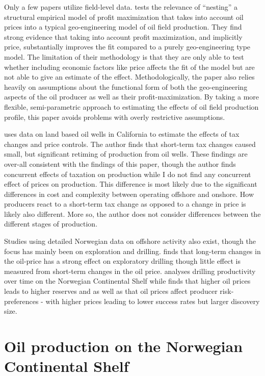 \documentclass[11pt]{article}
\begin{document}
Only a few papers utilize field-level data.  \citet{black_is_1998} tests the relevance of “nesting” a structural empirical model of profit maximization that takes into account oil prices into a typical geo-engineering model of oil field production.  They find strong evidence that taking into account profit maximization, and implicitly price, substantially improves the fit compared to a purely geo-engineering type model.   The limitation of their methodology is that they are only able to test whether including economic factors like price affects the fit of the model but are not able to give an estimate of the effect.  Methodologically, the paper also relies heavily on assumptions about the functional form of both the geo-engineering aspects of the oil producer as well as their profit-maximization.  By taking a more flexible, semi-parametric approach to estimating the effects of oil field production profile, this paper avoids problems with overly restrictive assumptions. 

\citet{rao_taxation_2010} uses data on land based oil wells in California to estimate the effects of tax changes and price controls.  The author finds that short-term tax changes caused small, but significant retiming of production from oil wells.  These findings are over-all consistent with the findings of this paper, though the author finds concurrent effects of taxation on production while I do not find any concurrent effect of prices on production.  This difference is most likely due to the significant differences in cost and complexity between operating offshore and onshore.  How producers react to a short-term tax change as opposed to a change in price is likely also different.  More so, the author does not consider differences between the different stages of production.   

Studies using detailed Norwegian data on offshore activity also exist, though the focus has mainly been on exploration and drilling.  \citet{mohn_exploration_2008} finds that long-term changes in the oil-price has a strong effect on exploratory drilling though little effect is measured from short-term changes in the oil price.  \citet{osmundsen_exploration_2010} analyses drilling productivity over time on the Norwegian Continental Shelf while \citet{mohn_efforts_2008} finds that higher oil prices leads to higher reserves and as well as that oil prices affect producer risk-preferences - with higher prices leading to lower success rates but larger discovery size.  


\section{Oil production on the Norwegian Continental Shelf}
\end{document}
